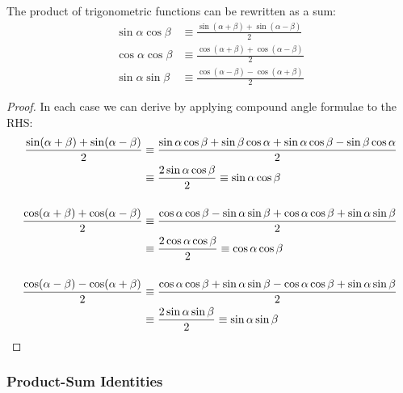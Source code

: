 \begin{theorem}
 The product of trigonometric functions can be rewritten as a sum:
 \begin{align*}
  \sin \alpha \cos \beta &\equiv
      \frac{\sin(\alpha + \beta) + \sin(\alpha - \beta)} 2 \\
  \cos \alpha \cos \beta &\equiv
   \frac{\cos(\alpha + \beta) + \cos(\alpha - \beta)} 2 \\
  \sin \alpha \sin \beta &\equiv
   \frac{\cos(\alpha - \beta) - \cos(\alpha + \beta)} 2
 \end{align*}
\end{theorem}
\begin{proof}
 In each case we can derive by applying compound angle formulae to the RHS:
 \begin{align*}
  \frac{\sin(\alpha + \beta) + \sin(\alpha - \beta)} 2 &\equiv
   \frac{\sin \alpha \cos \beta + \sin \beta \cos \alpha +
         \sin \alpha \cos \beta - \sin \beta \cos \alpha} 2 \\
  &\equiv \frac{2 \sin \alpha \cos \beta}
   2 \equiv \sin \alpha \cos \beta \\[3ex]
  \frac{\cos(\alpha + \beta) + \cos(\alpha - \beta)} 2 &\equiv
   \frac{\cos \alpha \cos \beta - \sin \alpha \sin \beta +
         \cos \alpha \cos \beta + \sin \alpha \sin \beta} 2 \\
  &\equiv \frac{2 \cos \alpha \cos \beta}
   2 \equiv \cos \alpha \cos \beta \\[3ex]
  \frac{\cos(\alpha - \beta) - \cos(\alpha + \beta)} 2 &\equiv
   \frac{\cos \alpha \cos \beta + \sin \alpha \sin \beta -
         \cos \alpha \cos \beta + \sin \alpha \sin \beta} 2 \\
  &\equiv \frac{2 \sin \alpha \sin \beta} 2 \equiv \sin \alpha \sin \beta
      \qedhere
 \end{align*}
\end{proof}

\subsubsection{Product-Sum Identities} \label{sec_trig_product_sum}


